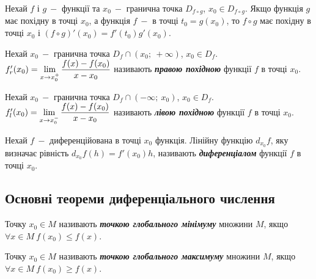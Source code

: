 \begin{theorem}
        Нехай $f$ і $g \: - $ функції та $x_0 \: -$ гранична точка $D_{f \circ g}$, $x_0 \in D_{f \circ g}$. Якщо функція $g$ має похідну в точці $x_0$, а функція $f \: -$ в точці $t_0 = g(x_0)$, то $f \circ g$ має похідну в точці $x_0$ і $(f \circ g)'(x_0) = f'(t_0) g'(x_0).$
\end{theorem}

\begin{definition}
        Нехай $x_0 \: - $ гранична точка $D_f \cap (x_0; \: +\infty)$, $x_0 \in D_f$. $f_r'(x_0) = \displaystyle\lim\limits_{x \to x_0^{+}} \dfrac{f(x) - f(x_0)}{x - x_0}$ називають \textcolor{NavyBlue}{\textbf{\textit{{правою похідною}}}} функції $f$ в точці $x_0$.
\end{definition}

\begin{definition}
        Нехай $x_0 \: - $ гранична точка $D_f \cap (-\infty; \: x_0)$, $x_0 \in D_f$. $f_l'(x_0) = \displaystyle\lim\limits_{x \to x_0^{-}} \dfrac{f(x) - f(x_0)}{x - x_0}$ називають \textcolor{NavyBlue}{\textbf{\textit{{лівою похідною}}}} функції $f$ в точці $x_0$.
\end{definition}

\begin{definition}
        Нехай $f \: -$ диференційована в точці $x_0$ функція. Лінійну функцію $d_{x_0}f$, яку визначає рівність $d_{x_0}f(h) = f'(x_0) h$, називають \textcolor{NavyBlue}{\textbf{\textit{{диференціалом}}}} функції $f$ в точці $x_0$.
\end{definition}

\subsection{\large{Основні теореми диференціального числення}} 

\begin{definition}
        Точку $x_0 \in M$ називають \textcolor{NavyBlue}{\textbf{\textit{{точкою глобального мінімуму}}}} множини $M$, якщо \newline  $\forall x \in M \: f(x_0) \leqslant  f(x).$
\end{definition}

\begin{definition}
        Точку $x_0 \in M$ називають \textcolor{NavyBlue}{\textbf{\textit{{точкою глобального максимуму}}}} множини $M$, якщо \newline  $\forall x \in M \: f(x_0) \geqslant   f(x).$
\end{definition}

